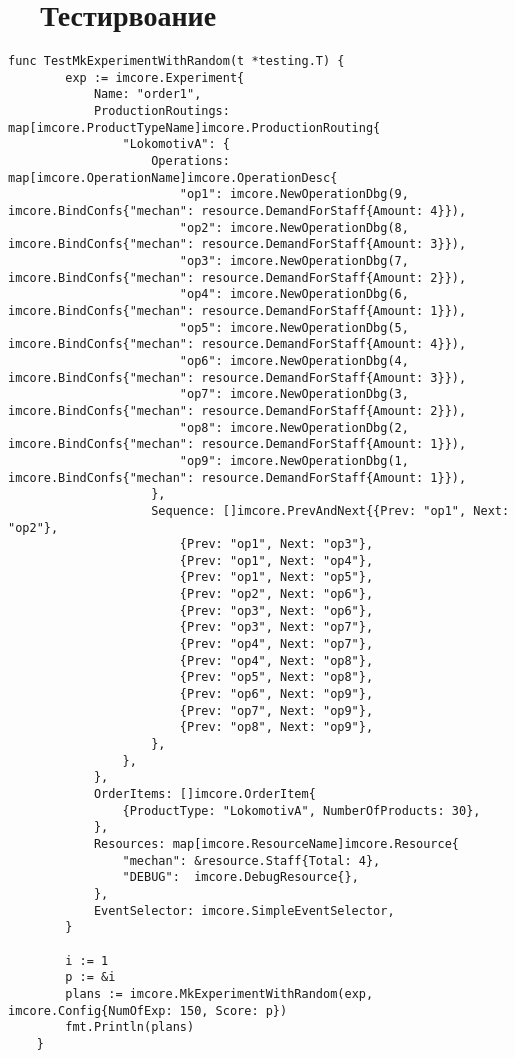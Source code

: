 \renewcommand\appendixname{Приложение~С}
\chapter*{~~Тестирвоание}\label{chap:c}
\addcontentsline{toc}{chapter}{\appendixname~~Тестирование}

\begin{lstlisting}[language=Golang,caption={Тестирование случайным перебором в процессе планирования},label=lst:code7]
    func TestMkExperimentWithRandom(t *testing.T) {
        exp := imcore.Experiment{
            Name: "order1",
            ProductionRoutings: map[imcore.ProductTypeName]imcore.ProductionRouting{
                "LokomotivA": {
                    Operations: map[imcore.OperationName]imcore.OperationDesc{
                        "op1": imcore.NewOperationDbg(9, imcore.BindConfs{"mechan": resource.DemandForStaff{Amount: 4}}),
                        "op2": imcore.NewOperationDbg(8, imcore.BindConfs{"mechan": resource.DemandForStaff{Amount: 3}}),
                        "op3": imcore.NewOperationDbg(7, imcore.BindConfs{"mechan": resource.DemandForStaff{Amount: 2}}),
                        "op4": imcore.NewOperationDbg(6, imcore.BindConfs{"mechan": resource.DemandForStaff{Amount: 1}}),
                        "op5": imcore.NewOperationDbg(5, imcore.BindConfs{"mechan": resource.DemandForStaff{Amount: 4}}),
                        "op6": imcore.NewOperationDbg(4, imcore.BindConfs{"mechan": resource.DemandForStaff{Amount: 3}}),
                        "op7": imcore.NewOperationDbg(3, imcore.BindConfs{"mechan": resource.DemandForStaff{Amount: 2}}),
                        "op8": imcore.NewOperationDbg(2, imcore.BindConfs{"mechan": resource.DemandForStaff{Amount: 1}}),
                        "op9": imcore.NewOperationDbg(1, imcore.BindConfs{"mechan": resource.DemandForStaff{Amount: 1}}),
                    },
                    Sequence: []imcore.PrevAndNext{{Prev: "op1", Next: "op2"},
                        {Prev: "op1", Next: "op3"},
                        {Prev: "op1", Next: "op4"},
                        {Prev: "op1", Next: "op5"},
                        {Prev: "op2", Next: "op6"},
                        {Prev: "op3", Next: "op6"},
                        {Prev: "op3", Next: "op7"},
                        {Prev: "op4", Next: "op7"},
                        {Prev: "op4", Next: "op8"},
                        {Prev: "op5", Next: "op8"},
                        {Prev: "op6", Next: "op9"},
                        {Prev: "op7", Next: "op9"},
                        {Prev: "op8", Next: "op9"},
                    },
                },
            },
            OrderItems: []imcore.OrderItem{
                {ProductType: "LokomotivA", NumberOfProducts: 30},
            },
            Resources: map[imcore.ResourceName]imcore.Resource{
                "mechan": &resource.Staff{Total: 4},
                "DEBUG":  imcore.DebugResource{},
            },
            EventSelector: imcore.SimpleEventSelector,
        }
    
        i := 1
        p := &i
        plans := imcore.MkExperimentWithRandom(exp, imcore.Config{NumOfExp: 150, Score: p})
        fmt.Println(plans)
    }

\end{lstlisting}